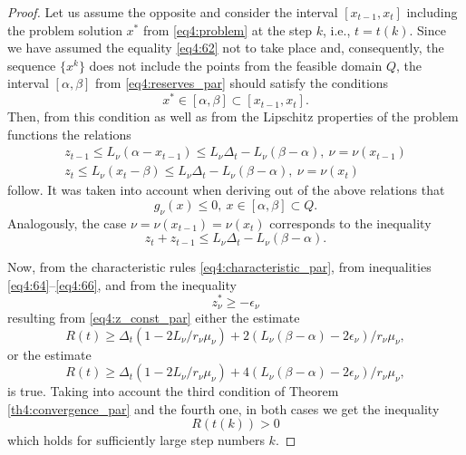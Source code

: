 \begin{proof}
  Let us assume the opposite and consider the interval $[x_{t-1},x_t]$ including the problem solution $x^*$ from \eqref{eq4:problem} at the step $k$, i.e., $t=t(k)$. Since we have assumed the equality \eqref{eq4:62} not to take place and, consequently, the sequence $\{x^k\}$ does not include the points from the feasible domain $Q$, the interval $[\alpha,\beta]$ from \eqref{eq4:reserves_par} should satisfy the conditions
  \begin{equation}
    \label{eq4:63}
    x^*\in [\alpha,\beta]\subset[x_{t-1}, x_t].
  \end{equation}
  Then, from this condition as well as from the Lipschitz properties of the problem functions the relations
  \begin{gather}
    \label{eq4:64}
    z_{t-1}\le L_\nu(\alpha - x_{t-1})\le L_\nu\Delta_t-L_\nu(\beta-\alpha),\:\nu=\nu(x_{t-1}) \\
    \label{eq4:65}
    z_t\le L_\nu(x_{t}-\beta)\le L_\nu\Delta_t-L_\nu(\beta-\alpha),\:\nu=\nu(x_{t})
  \end{gather}
  follow. It was taken into account when deriving out of the above relations that
  \begin{displaymath}
    g_\nu(x)\le 0,\: x\in[\alpha,\beta]\subset Q.
  \end{displaymath}
  Analogously, the case $\nu=\nu(x_{t-1})=\nu(x_t)$ corresponds to the inequality
  \begin{equation}
    \label{eq4:66}
    z_t+z_{t-1}\le L_\nu \Delta_t - L_\nu(\beta-\alpha).
  \end{equation}

  Now, from the characteristic rules \eqref{eq4:characteristic_par}, from inequalities \eqref{eq4:64}–\eqref{eq4:66}, and from the inequality
  \begin{displaymath}
    z^*_\nu\ge-\epsilon_\nu
  \end{displaymath}
  resulting from \eqref{eq4:z_const_par} either the estimate
  \begin{displaymath}
    R(t)\ge\Delta_t(1-2L_\nu/r_\nu\mu_\nu)+2(L_\nu(\beta-\alpha)-2\epsilon_\nu)/r_\nu\mu_\nu,
  \end{displaymath}
  or the estimate
  \begin{displaymath}
    R(t)\ge\Delta_t(1-2L_\nu/r_\nu\mu_\nu)+4(L_\nu(\beta-\alpha)-2\epsilon_\nu)/r_\nu\mu_\nu,
  \end{displaymath}
  is true. Taking into account the third condition of Theorem \ref{th4:convergence_par} and the fourth one, in both cases we get the inequality
  \begin{equation}
    \label{eq4:67}
    R(t(k))>0
  \end{equation}
  which holds for sufficiently large step numbers $k$.


\end{proof}

